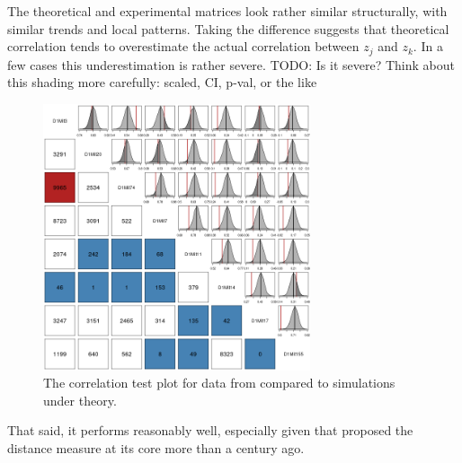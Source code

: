 \documentclass{article}
\newcommand{\TODO}[1]{{\color{brickred} TODO:  {#1}}}
\begin{document}
The theoretical and experimental matrices look rather similar structurally, with similar trends and local patterns. Taking the difference suggests that theoretical correlation tends to overestimate the actual correlation between $z_j$ and $z_k$. In a few cases this underestimation is rather severe. \TODO{Is it severe? Think about this shading more carefully: scaled, CI, p-val, or the like}

\begin{figure}[htp]
  \begin{center}
      \includegraphics[width = 0.7\textwidth]{./img/chevCorrTest.png}
  \end{center}
  \caption{The correlation test plot for data from \cite{cheverudetal2001} compared to simulations under theory.}
  \label{fig:corrTestPlot}
\end{figure}

That said, it performs reasonably well, especially given that \cite{haldane1919} proposed the distance measure at its core more than a century ago.
\end{document}
